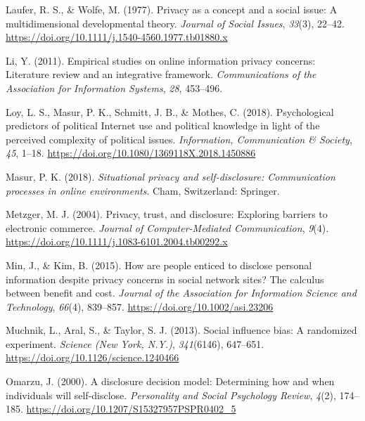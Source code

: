 \documentclass[
  english,
  man,floatsintext]{apa6}
\begin{document}
\leavevmode\hypertarget{ref-lauferPrivacyConceptSocial1977}{}%
Laufer, R. S., \& Wolfe, M. (1977). Privacy as a concept and a social issue: A multidimensional developmental theory. \emph{Journal of Social Issues}, \emph{33}(3), 22--42. \url{https://doi.org/10.1111/j.1540-4560.1977.tb01880.x}

\leavevmode\hypertarget{ref-liEmpiricalStudiesOnline2011}{}%
Li, Y. (2011). Empirical studies on online information privacy concerns: Literature review and an integrative framework. \emph{Communications of the Association for Information Systems}, \emph{28}, 453--496.

\leavevmode\hypertarget{ref-loyPsychologicalPredictorsPolitical2018}{}%
Loy, L. S., Masur, P. K., Schmitt, J. B., \& Mothes, C. (2018). Psychological predictors of political Internet use and political knowledge in light of the perceived complexity of political issues. \emph{Information, Communication \& Society}, \emph{45}, 1--18. \url{https://doi.org/10.1080/1369118X.2018.1450886}

\leavevmode\hypertarget{ref-masurSituationalPrivacySelfdisclosure2018}{}%
Masur, P. K. (2018). \emph{Situational privacy and self-disclosure: Communication processes in online environments}. Cham, Switzerland: Springer.

\leavevmode\hypertarget{ref-metzgerPrivacyTrustDisclosure2004}{}%
Metzger, M. J. (2004). Privacy, trust, and disclosure: Exploring barriers to electronic commerce. \emph{Journal of Computer-Mediated Communication}, \emph{9}(4). \url{https://doi.org/10.1111/j.1083-6101.2004.tb00292.x}

\leavevmode\hypertarget{ref-minHowArePeople2015}{}%
Min, J., \& Kim, B. (2015). How are people enticed to disclose personal information despite privacy concerns in social network sites? The calculus between benefit and cost. \emph{Journal of the Association for Information Science and Technology}, \emph{66}(4), 839--857. \url{https://doi.org/10.1002/asi.23206}

\leavevmode\hypertarget{ref-muchnikSocialInfluenceBias2013}{}%
Muchnik, L., Aral, S., \& Taylor, S. J. (2013). Social influence bias: A randomized experiment. \emph{Science (New York, N.Y.)}, \emph{341}(6146), 647--651. \url{https://doi.org/10.1126/science.1240466}

\leavevmode\hypertarget{ref-omarzuDisclosureDecisionModel2000}{}%
Omarzu, J. (2000). A disclosure decision model: Determining how and when individuals will self-disclose. \emph{Personality and Social Psychology Review}, \emph{4}(2), 174--185. \url{https://doi.org/10.1207/S15327957PSPR0402_5}
\end{document}
